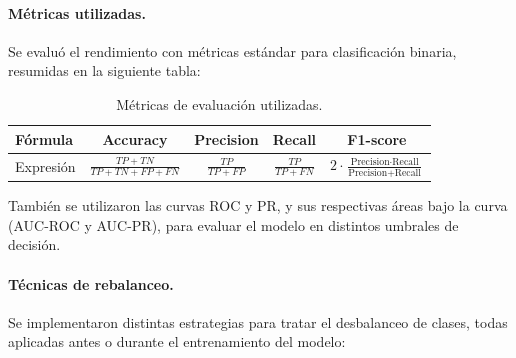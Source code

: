 \documentclass[11pt]{article}
\begin{document}
\paragraph{Métricas utilizadas.}

Se evaluó el rendimiento con métricas estándar para clasificación binaria, resumidas en la siguiente tabla:

\vspace{0.5em}
\begin{table}[h]
\centering
\label{tab:metricas}
\begin{tabular}{lcccc}
\toprule
\textbf{Fórmula} & \textbf{Accuracy} & \textbf{Precision} & \textbf{Recall} & \textbf{F1-score} \\
\midrule
\small Expresión & 
$\displaystyle \frac{TP + TN}{TP + TN + FP + FN}$ &
$\displaystyle \frac{TP}{TP + FP}$ &
$\displaystyle \frac{TP}{TP + FN}$ &
$\displaystyle 2 \cdot \frac{\text{Precision} \cdot \text{Recall}}{\text{Precision} + \text{Recall}}$ \\
\bottomrule
\end{tabular}
\caption{Métricas de evaluación utilizadas.}
\end{table}

También se utilizaron las curvas ROC y PR, y sus respectivas áreas bajo la curva (AUC-ROC y AUC-PR), para evaluar el modelo en distintos umbrales de decisión.


\paragraph{Técnicas de rebalanceo.}

Se implementaron distintas estrategias para tratar el desbalanceo de clases, todas aplicadas antes o durante el entrenamiento del modelo:
\end{document}
